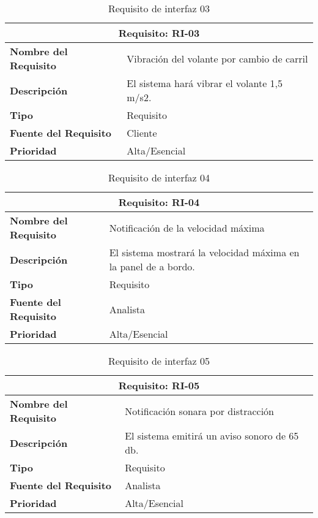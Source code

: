 \begin{table}[H]
\begin{center}
\begin{tabular}{p{} p{7cm}}
\multicolumn{2}{c}{\textbf{Requisito: RI-03} } \\
\hline \hline
\textbf{Nombre del Requisito} & Vibración del volante por cambio de carril\\
\hline
\textbf{Descripción} & El sistema hará vibrar el volante 1,5 m/s2. \\
\hline
\textbf{Tipo} & Requisito  \\
\hline
\textbf{Fuente del Requisito} & Cliente \\
\hline
\textbf{Prioridad} & Alta/Esencial  \\ \hline
\end{tabular}
\caption{Requisito de interfaz 03}
\label{tab:RI-03}
\end{center}
\end{table}

\begin{table}[H]
\begin{center}
\begin{tabular}{p{} p{7cm}}
\multicolumn{2}{c}{\textbf{Requisito: RI-04} } \\
\hline \hline
\textbf{Nombre del Requisito} & Notificación de la velocidad máxima\\
\hline
\textbf{Descripción} & El sistema mostrará la velocidad máxima en la panel de a bordo.\\
\hline
\textbf{Tipo} & Requisito  \\
\hline
\textbf{Fuente del Requisito} & Analista \\
\hline
\textbf{Prioridad} & Alta/Esencial  \\ \hline
\end{tabular}
\caption{Requisito de interfaz 04}
\label{tab:RI-04}
\end{center}
\end{table}

\begin{table}[H]
\begin{center}
\begin{tabular}{p{} p{7cm}}
\multicolumn{2}{c}{\textbf{Requisito: RI-05} } \\
\hline \hline
\textbf{Nombre del Requisito} & Notificación sonara por distracción\\
\hline
\textbf{Descripción} & El sistema emitirá un aviso sonoro de 65 db. \\
\hline
\textbf{Tipo} & Requisito  \\
\hline
\textbf{Fuente del Requisito} & Analista \\
\hline
\textbf{Prioridad} & Alta/Esencial  \\ \hline
\end{tabular}
\caption{Requisito de interfaz 05}
\label{tab:RI-05}
\end{center}
\end{table}

